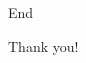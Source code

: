 \documentclass[9pt]{beamer}
\theoremstyle{definition}
\begin{document}

\begin{frame}[fragile]{End}
  \begin{center}
    Thank you!
  \end{center}
\end{frame}

\end{document}
